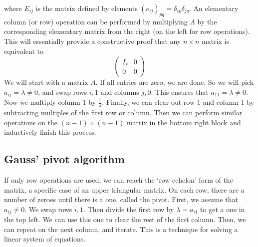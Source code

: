 where \( E_{ij} \) is the matrix defined by elements \( (e_{ij})_{pq} = \delta_{ip} \delta_{jq} \).
An elementary column (or row) operation can be performed by multiplying \( A \) by the corresponding elementary matrix from the right (on the left for row operations).
This will essentially provide a constructive proof that any \( n \times n \) matrix is equivalent to
\[
	\begin{pmatrix} I_r & 0 \\ 0 & 0 \end{pmatrix}
\]
We will start with a matrix \( A \).
If all entries are zero, we are done.
So we will pick \( a_{ij} = \lambda \neq 0 \), and swap rows \( i,1 \) and columns \( j,0 \).
This ensures that \( a_{11} = \lambda \neq 0 \).
Now we multiply column 1 by \( \frac{1}{\lambda} \).
Finally, we can clear out row 1 and column 1 by subtracting multiples of the first row or column.
Then we can perform similar operations on the \( (n-1)\times(n-1) \) matrix in the bottom right block and inductively finish this process.

\subsection{Gauss' pivot algorithm}
If only row operations are used, we can reach the `row echelon' form of the matrix, a specific case of an upper triangular matrix.
On each row, there are a number of zeroes until there is a one, called the pivot.
First, we assume that \( a_{ij} \neq 0 \).
We swap rows \( i, 1 \).
Then divide the first row by \( \lambda = a_{i1} \) to get a one in the top left.
We can use this one to clear the rest of the first column.
Then, we can repeat on the next column, and iterate.
This is a technique for solving a linear system of equations.

